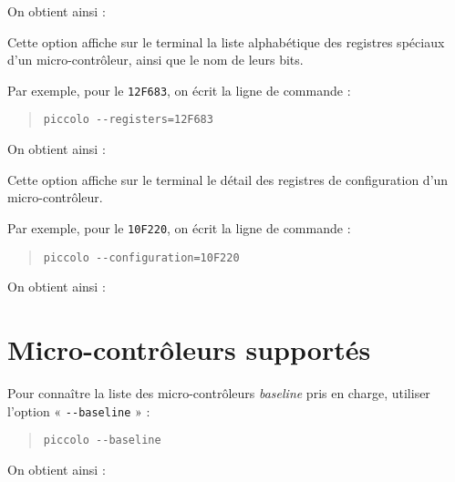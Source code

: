 On obtient ainsi : 




Cette option affiche sur le terminal la liste alphabétique des registres spéciaux d'un micro-contrôleur, ainsi que le nom de leurs bits.

Par exemple, pour le \texttt{12F683}, on écrit la ligne de commande :
\begin{quote}
  \texttt{piccolo -{}-registers=12F683}
\end{quote}

On obtient ainsi : 




Cette option affiche sur le terminal le détail des registres de configuration d'un micro-contrôleur.

Par exemple, pour le \texttt{10F220}, on écrit la ligne de commande :
\begin{quote}
  \texttt{piccolo -{}-configuration=10F220}
\end{quote}

On obtient ainsi : 










\section{Micro-contrôleurs supportés}


Pour connaître la liste des micro-contrôleurs \emph{baseline} pris en charge, utiliser l’option « \texttt{-{}-baseline} » :
\begin{quote}
\texttt{piccolo -{}-baseline}
\end{quote}

On obtient ainsi : 








